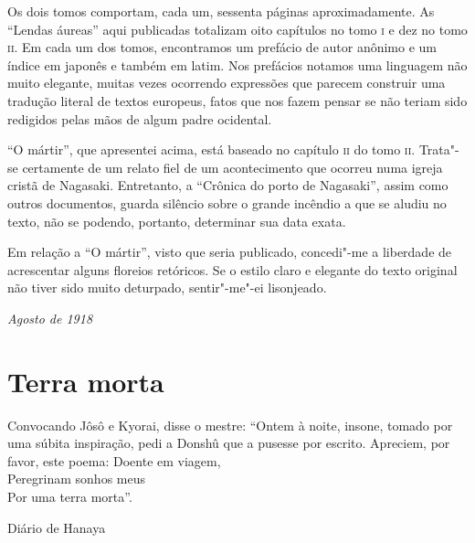 Os dois tomos comportam, cada um, sessenta páginas aproximadamente. As
``Lendas áureas'' aqui publicadas totalizam oito capítulos no tomo \textsc{i} e
dez no tomo \textsc{ii}. Em cada um dos tomos, encontramos um prefácio de autor
anônimo e um índice em japonês e também em latim. Nos prefácios notamos
uma linguagem não muito elegante, muitas vezes ocorrendo expressões que
parecem construir uma tradução literal de textos europeus, fatos que
nos fazem pensar se não teriam sido redigidos pelas mãos de algum padre
ocidental.

``O mártir'', que apresentei acima, está baseado no capítulo \textsc{ii} do tomo
\textsc{ii}. Trata"-se certamente de um relato fiel de um acontecimento que
ocorreu numa igreja cristã de Nagasaki. Entretanto, a ``Crônica do porto
de Nagasaki'', assim como outros documentos, guarda silêncio sobre o
grande incêndio a que se aludiu no texto, não se podendo, portanto,
determinar sua data exata.

Em relação a ``O mártir'', visto que seria publicado, concedi"-me a
liberdade de acrescentar alguns floreios retóricos. Se o estilo claro e
elegante do texto original não tiver sido muito deturpado, sentir"-me"-ei
lisonjeado.

\begin{flushright}
\textit{Agosto de 1918}\\  
\end{flushright}


\chapter{Terra morta}

\epigraph{Convocando Jôsô e Kyorai, disse o mestre: ``Ontem à noite, insone, tomado por uma súbita
inspiração, pedi a Donshû que a pusesse por escrito. Apreciem, por favor, este poema:
\smallskip
\hspace{1.2em}Doente em viagem,\\
\hspace{1.2em}Peregrinam sonhos meus\\
\hspace{1.2em}Por uma terra morta''.}{Diário de Hanaya\footnotemark}

